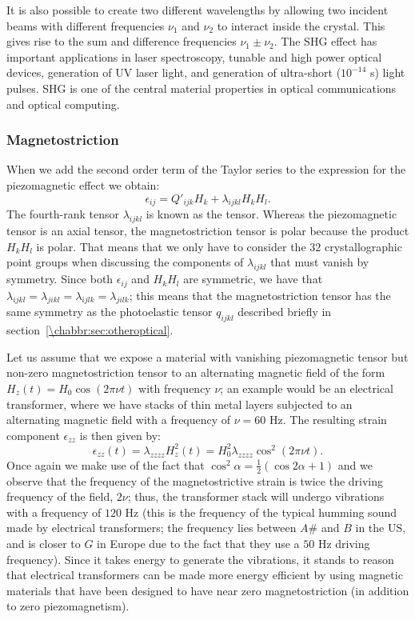 It is also possible to create two different wavelengths by allowing two incident beams with different frequencies $\nu_1$ and $\nu_2$ to interact inside the crystal.  This gives rise to the sum and difference frequencies $\nu_1\pm\nu_2$.  The SHG effect has important applications in laser spectroscopy, tunable and high power optical devices, generation of UV laser light, and generation of ultra-short ($10^{-14}$ s) light pulses.  SHG is one of the central material properties in optical communications and optical computing.

\subsubsection{Magnetostriction}\label{\chabbr:sec:magnetostriction}

When we add the second order term of the Taylor series to the expression for the piezomagnetic effect we obtain:
\begin{equation}
	\epsilon_{ij} = Q'_{ijk} H_k + \lambda_{ijkl}H_kH_l.
\end{equation}
The fourth-rank tensor $\lambda_{ijkl}$ is known as the  tensor. Whereas the piezomagnetic tensor is an axial tensor, the magnetostriction tensor is polar because the product $H_kH_l$ is polar.  That means that we only have to consider the $32$ crystallographic point groups when discussing the components of $\lambda_{ijkl}$ that must vanish by symmetry.  Since both $\epsilon_{ij}$ and $H_kH_l$ are symmetric, we have that $\lambda_{ijkl}=\lambda_{jikl}=\lambda_{ijlk}=\lambda_{jilk}$; this means that the magnetostriction tensor has the same symmetry as the photoelastic tensor $q_{ijkl}$ described briefly in section~\ref{\chabbr:sec:otheroptical}.  

Let us assume that we expose a material with vanishing piezomagnetic tensor but non-zero magnetostriction tensor to an alternating magnetic field of the form $H_z(t) = H_0 \cos(2\pi\nu t)$ with frequency $\nu$; an example would be an electrical transformer, where we have stacks of thin metal layers subjected to an alternating magnetic field with a frequency of $\nu=60$ Hz.  The resulting strain component $\epsilon_{zz}$ is then given by:
\[
	\epsilon_{zz}(t) = \lambda_{zzzz}H_z^2(t) = H_0^2 \lambda_{zzzz}\cos^2(2\pi\nu t). 
\]
Once again we make use of the fact that $\cos^2\alpha = \frac{1}{2}(\cos 2\alpha+1)$ and we observe that the frequency of the magnetostrictive strain is twice the driving frequency of the field, $2\nu$; thus, the transformer stack will undergo vibrations with a frequency of $120$ Hz (this is the frequency of the typical humming sound made by electrical transformers; the frequency lies between $A\#$ and $B$ in the US, and is closer to $G$ in Europe due to the fact that they use a $50$ Hz driving frequency).  Since it takes energy to generate the vibrations, it stands to reason that electrical transformers can be made more energy efficient by using magnetic materials that have been designed to have near zero magnetostriction (in addition to zero piezomagnetism).  


